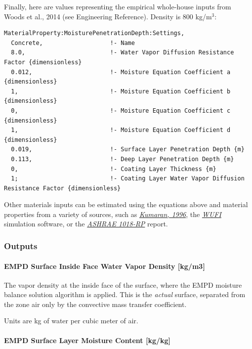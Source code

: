 Finally, here are values representing the empirical whole-house inputs from Woods et al., 2014 (see Engineering Reference). Density is 800 kg/m$^3$:

\begin{lstlisting}
MaterialProperty:MoisturePenetrationDepth:Settings,
  Concrete,                   !- Name
  8.0,                        !- Water Vapor Diffusion Resistance Factor {dimensionless}
  0.012,                      !- Moisture Equation Coefficient a {dimensionless}
  1,                          !- Moisture Equation Coefficient b {dimensionless}
  0,                          !- Moisture Equation Coefficient c {dimensionless}
  1,                          !- Moisture Equation Coefficient d {dimensionless}
  0.019,                      !- Surface Layer Penetration Depth {m}
  0.113,                      !- Deep Layer Penetration Depth {m}
  0,                          !- Coating Layer Thickness {m}
  1;                          !- Coating Layer Water Vapor Diffusion Resistance Factor {dimensionless}
\end{lstlisting}

Other materials inputs can be estimated using the equations above and material properties from a variety of sources, such as \href{http://www.iea-ebc.org/fileadmin/user_upload/images/Pictures/EBC_Annex_24_Report_3.pdf}{\emph{Kumaran, 		1996}}, the \href{http://WUFI.de/en/}{\emph{WUFI}} simulation software, or the \href{http://www.techstreet.com/products/1719052}{\emph{ASHRAE 1018-RP}} report.

\subsubsection{Outputs}\label{moisture-penetration-depth-empd-outputs}

\paragraph{EMPD Surface Inside Face Water Vapor Density {[}kg/m3{]}}\label{empd-surface-inside-face-water-vapor-density-kgm3}

The vapor density at the inside face of the surface, where the EMPD moisture balance solution algorithm is applied. This is the \emph{actual} surface, separated from the zone air only by the convective mass transfer coefficient.

Units are kg of water per cubic meter of air.

\paragraph{EMPD Surface Layer Moisture Content {[}kg/kg{]}}\label{empd-surface-layer-moisture-content-kgkg}

